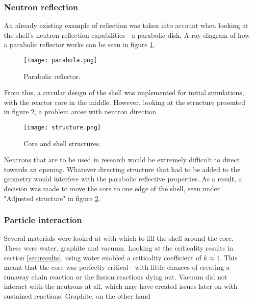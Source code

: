 \subsubsection{Neutron reflection}

An already existing example of reflection was taken into account when looking at the shell's neutron reflection capabilities - a parabolic dish. A ray diagram of how a parabolic reflector works can be seen in figure \ref{fig:parabola}.

\begin{figure}[!htbp]
\caption{Parabolic reflector.}
\label{fig:parabola}
\centering
\texttt{[image: parabola.png]}
\end{figure}

From this, a circular design of the shell was implemented for initial simulations, with the reactor core in the middle. However, looking at the structure presented in figure \ref{fig:structure}, a problem arose with neutron direction.

\begin{figure}[!htbp]
\caption{Core and shell structures.}
\label{fig:structure}
\centering
\texttt{[image: structure.png]}
\end{figure}

Neutrons that are to be used in research would be extremely difficult to direct towards an opening. Whatever directing structure that had to be added to the geometry would interfere with the parabolic reflective properties. As a result, a decision was made to move the core to one edge of the shell, seen under "Adjusted structure" in figure \ref{fig:structure}.

\subsubsection{Particle interaction}

Several materials were looked at with which to fill the shell around the core. These were water, graphite and vacuum. Looking at the criticality results in section \ref{sec:results},
using water enabled a criticality coefficient of $k\approx 1$. This meant that the core was perfectly critical - with little chances of creating a runaway chain reaction or the fission reactions dying out. Vacuum did not interact with the neutrons at all, which may have created issues later on with sustained reactions. Graphite, on the other hand

